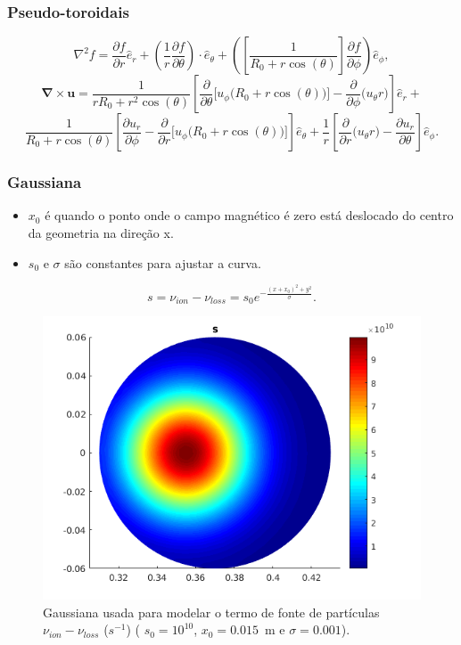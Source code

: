 \documentclass[aspectratio=169]{beamer}
\begin{document}
		   \begin{frame}
			\frametitle{Pseudo-toroidais}
\begin{equation}
\nabla^2 f = \dfrac{\partial f}{\partial r}  \hat{e}_r + \left(\frac{1}{r}\dfrac{\partial f}{\partial \theta} \right) \cdot \hat{e}_\theta + \left( \left[ \frac{1}{ R_0 + r \cos(\theta)}\right] \dfrac{\partial f}{\partial \phi}\right)  \hat{e}_\phi,
\end{equation}
\begin{equation}
\bm{\nabla} \times \bm{u} = \frac{1}{r R_0 + r^2 \cos(\theta)} \left[ \dfrac{\partial }{\partial \theta} \Big[ u_\phi \big(R_0 + r \cos(\theta)\big)\Big] - \dfrac{\partial }{\partial \phi} \big( u_\theta r \big) \right] \hat{e}_r+
\end{equation}
\begin{equation*}
\frac{1}{R_0 + r \cos(\theta)} \left[ \dfrac{\partial u_r}{\partial \phi} - \dfrac{\partial }{\partial r} \Big[ u_\phi  \big( R_0 + r \cos(\theta) \big) \Big] \right] \hat{e}_\theta+\frac{1}{r} \left[ \dfrac{\partial }{\partial r}\big( u_\theta  r\big) - \dfrac{\partial u_r}{\partial \theta}  \right] \hat{e}_\phi.
\end{equation*}
	\end{frame}

	\begin{frame}		
\frametitle{Gaussiana}
\begin{itemize}
\item $x_0$ é quando o ponto onde o campo magnético é zero está deslocado do centro da geometria na direção x.
\item $s_0$ e $\sigma$ são constantes para ajustar a curva.
\end{itemize}
\begin{equation}
\label{gaussiana}
s = \nu_{ion} - \nu_{loss} = s_0 e^{-\frac{ (x+x_0)^2+y^2 }{\sigma}} .
\end{equation} 
\begin{figure}[H]
\centering
\includegraphics[scale=0.3]{../SImulacao_breakdown/PDE/sB.png} 
\caption{Gaussiana usada para modelar o termo de fonte de partículas $\nu_{ion} - \nu_{loss}$ ($s^{-1}$) ( $s_0=10^{10}$, $x_0=0.015$\ m e $\sigma=0.001$).}
\label{grafgaussiana}
\end{figure}
\end{frame}	
	
\end{document}
